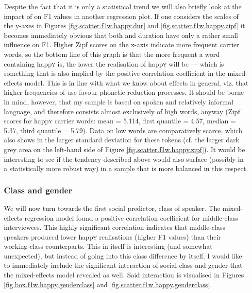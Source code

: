 Despite the fact that it is only a statistical trend we will also briefly look at the impact of  on F1 values in another regression plot.
If one considers the scales of the y-axes in Figures \ref{fig.scatter.f1w.happy.dur} and \ref{fig.scatter.f1w.happy.zipf} it becomes immediately obvious that both  and duration have only a rather small influence on F1.
Higher Zipf scores on the x-axis indicate more frequent carrier words, so the bottom line of this graph is that the more frequent a word containing happ\textsc{y} is, the lower the realisation of happ\textsc{y} will be --- which is something that is also implied by the positive correlation coefficient in the mixed-effects model.
This is in line with what we know about  effects in general, viz. that higher frequencies of use favour phonetic reduction processes.
It should be borne in mind, however, that my sample is based on spoken and relatively informal language, and therefore consists almost exclusively of high  words, anyway (Zipf scores for happ\textsc{y} carrier words: mean = 5.114, first quantile = 4.57, median = 5.37, third quantile = 5.79).
Data on low  words are comparatively scarce, which also shows in the larger standard deviation for these tokens (cf. the larger dark grey area on the left-hand side of Figure \ref{fig.scatter.f1w.happy.zipf}).
It would be interesting to see if the tendency described above would also surface (possibly in a statistically more robust way) in a sample that is more balanced in this respect.

			\subsubsection{Class and gender}
			\label{sec.prod.res.vow.happy.f1.classgender}

We will now turn towards the first social predictor, class of speaker.
The mixed-effects regression model found a positive correlation coefficient for middle-class interviewees.
This highly significant correlation indicates that middle-class speakers produced lower happ\textsc{y} realisations (higher F1 values) than their working-class counterparts.
This in itself is interesting (and somewhat unexpected), but instead of going into this class difference by itself, I would like to immediately include the significant interaction of social class and gender that the mixed-effects model revealed as well.
Said interaction is visualised in Figures \ref{fig.box.f1w.happy.genderclass} and \ref{fig.scatter.f1w.happy.genderclass}.

